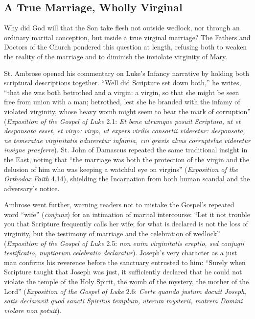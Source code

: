 \subsection{A True Marriage, Wholly Virginal}\label{subsec:true-virginal-marriage}

Why did God will that the Son take flesh not outside wedlock, nor through an ordinary marital conception, but inside a true virginal marriage? The Fathers and Doctors of the Church pondered this question at length, refusing both to weaken the reality of the marriage and to diminish the inviolate virginity of Mary.

St. Ambrose opened his commentary on Luke's Infancy narrative by holding both scriptural descriptions together. ``Well did Scripture set down both,'' he writes, ``that she was both betrothed and a virgin: a virgin, so that she might be seen free from union with a man; betrothed, lest she be branded with the infamy of violated virginity, whose heavy womb might seem to bear the mark of corruption'' (\textit{Exposition of the Gospel of Luke} 2.1: \textit{Et bene utrumque posuit Scriptura, ut et desponsata esset, et virgo: virgo, ut expers virilis consortii videretur: desponsata, ne temeratae virginitatis adureretur infamia, cui gravis alvus corruptelae videretur insigne praeferre}). St. John of Damascus repeated the same traditional insight in the East, noting that ``the marriage was both the protection of the virgin and the delusion of him who was keeping a watchful eye on virgins'' (\textit{Exposition of the Orthodox Faith} 4.14), shielding the Incarnation from both human scandal and the adversary's notice.

Ambrose went further, warning readers not to mistake the Gospel's repeated word ``wife'' (\textit{conjunx}) for an intimation of marital intercourse: ``Let it not trouble you that Scripture frequently calls her wife; for what is declared is not the loss of virginity, but the testimony of marriage and the celebration of wedlock'' (\textit{Exposition of the Gospel of Luke} 2.5: \textit{non enim virginitatis ereptio, sed conjugii testificatio, nuptiarum celebratio declaratur}). Joseph's very character as a just man confirms his reverence before the sanctuary entrusted to him: ``Surely when Scripture taught that Joseph was just, it sufficiently declared that he could not violate the temple of the Holy Spirit, the womb of the mystery, the mother of the Lord'' (\textit{Exposition of the Gospel of Luke} 2.6: \textit{Certe quando justum docuit Joseph, satis declaravit quod sancti Spiritus templum, uterum mysterii, matrem Domini violare non potuit}).

